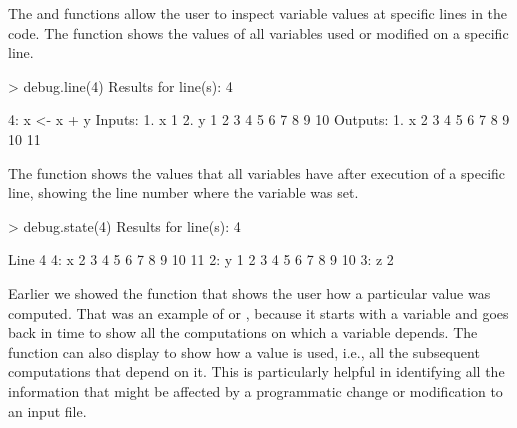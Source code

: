
The  and  functions allow the user to inspect variable values at specific lines in the code.  The  function shows the values of all variables used or modified on a specific line.
\begin{example}
> debug.line(4)
Results for line(s): 4 

4: x <- x + y
	 Inputs: 
		1. x   1
		2. y    1  2  3  4  5  6  7  8  9 10
	 Outputs: 
		1. x    2  3  4  5  6  7  8  9 10 11
\end{example}
The  function shows the values that all variables have after execution of a specific line, showing the line number where the variable was set. 
\begin{example}
> debug.state(4)
Results for line(s): 4 

Line 4 
	4: 	x	 2  3  4  5  6  7  8  9 10 11
	2: 	y	 1  2  3  4  5  6  7  8  9 10
	3: 	z	2


\end{example}

%

%

Earlier we showed the  function that shows the user how a particular value was computed.  That was an example of  or , because it starts with a variable and goes back in time to show all the computations on which a variable depends. The  function can also display  to show how a value is used, i.e., all the subsequent computations that depend on it.  This is  particularly helpful in identifying all the information that might be affected by a programmatic change or modification to an input file.
\begin{example}
> debug.lineage(x, forward = TRUE)
Var x 
	1: 	 x <- 1 
	4: 	 x <- x + y 
	5: 	 if (x == 2) { 
\end{example}

%

